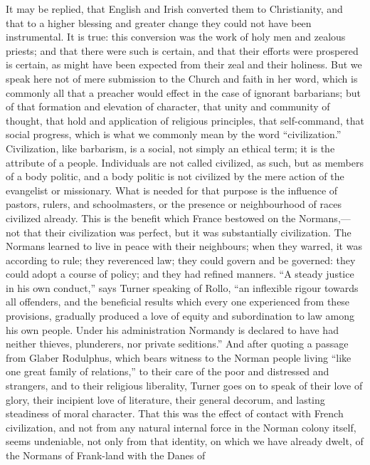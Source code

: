 It may be replied, that
English and Irish converted them to Christianity, and that to a higher
blessing and greater change they could not have been instrumental. It
is true: this conversion was the work of holy men and zealous priests;
and that there were such is certain, and that their efforts were
prospered is certain, as might have been expected from their zeal and
their holiness. But we speak here not of mere submission to the Church
and faith in her word, which is commonly all that a preacher would
effect in the case of ignorant barbarians; but of that formation and
elevation of character, that unity and community of thought, that hold
and application of religious principles, that self-command, that
social progress, which is what we commonly mean by the word ``civilization.''
Civilization, like barbarism, is a social, not simply an ethical term;
it is the attribute of a people. Individuals are not called civilized,
as such, but as members of a body politic, and a body politic is not
civilized by the mere action of the evangelist or missionary. What is
needed for that purpose is the influence of pastors, rulers, and
schoolmasters, or the presence or neighbourhood of races civilized
already. This is the benefit which France bestowed on the
Normans,—not that their civilization was perfect, but it was
substantially civilization. The Normans learned to live in peace with
their neighbours; when they warred, it was according to rule; they
reverenced law; they could govern and be governed: they could adopt a
course of policy; and they had refined manners. ``A steady justice in
his own conduct,'' says Turner speaking of Rollo, ``an inflexible rigour
towards all offenders, and the beneficial results which every one
experienced from these provisions, gradually produced a love of equity
and subordination to law among his own people. Under his
administration Normandy is declared to have had neither thieves,
plunderers, nor private seditions.'' And after quoting a passage from
Glaber Rodulphus, which bears witness to the Norman people living ``like
one great family of relations,'' to their care of the poor and
distressed and strangers, and to their religious liberality, Turner
goes on to speak of their love of glory, their incipient love of
literature, their general decorum, and lasting steadiness of moral
character. That this was the effect of contact with French
civilization, and not from any natural internal force in the Norman
colony itself, seems undeniable, not only from that identity, on which
we have already dwelt, of the Normans of Frank-land with the Danes of
